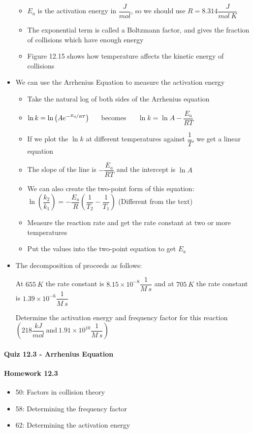 \documentclass[12pt, openany, letterpaper]{memoir}
\begin{document}
\begin{itemize}
\begin{itemize}
		\item $E_a$ is the activation energy in $\dfrac{J}{mol}$, so we should use $R=8.314\dfrac{J}{mol~K}$
		\item The exponential term is called a Boltzmann factor, and gives the fraction of collisions which have enough energy
		\item Figure 12.15 shows how temperature affects the kinetic energy of collisions
	\end{itemize}
	\item We can use the Arrhenius Equation to measure the activation energy
	\begin{itemize}
		\item Take the natural log of both sides of the Arrhenius equation
		\item $\ln k=\ln\left(Ae^{-\nicefrac{E_a}{RT}}\right)$ ~~ becomes ~~ $\ln k = \ln A - \dfrac{E_a}{RT}$
		\item If we plot the $\ln k$ at different temperatures against $\dfrac{1}{T}$, we get a linear equation
		\item The slope of the line is $-\dfrac{E_a}{RT}$ and the intercept is $\ln A$
		\item We can also create the two-point form of this equation: $\ln\left(\dfrac{k_2}{k_1}\right)=-\dfrac{E_a}{R}\left(\dfrac{1}{T_2}-\dfrac{1}{T_1}\right)$ (Different from the text)
		\item Measure the reaction rate and get the rate constant at two or more temperatures
		\item Put the values into the two-point equation to get $E_a$		
	\end{itemize}
	\item The decomposition of  proceeds as follows: 
	
	At $655~K$ the rate constant is $8.15\times10^{-8}\dfrac{1}{M~s}$ and at $705~K$ the rate constant is $1.39\times10^{-6}\dfrac{1}{M~s}$
	
	Determine the activation energy and frequency factor for this reaction $\left(218\dfrac{kJ}{mol}~\mathrm{and}~1.91\times10^{10}\dfrac{1}{M~s}\right)$
\end{itemize}

\paragraph*{Quiz 12.3 - Arrhenius Equation}
\paragraph*{Homework 12.3}
\begin{itemize}
  \item 50: Factors in collision theory
  \item 58: Determining the frequency factor
  \item 62: Determining the activation energy
\end{itemize}
\end{document}
